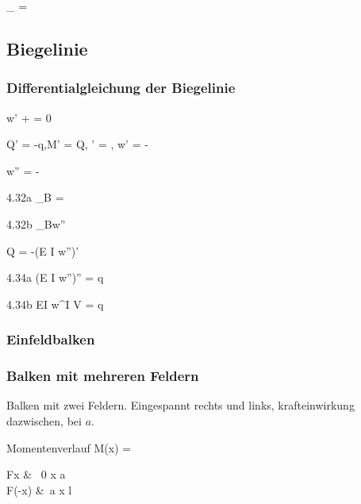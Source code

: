 \documentclass[11pt]{article}
\newcommand{\1}{ {\mathds{1}} }
\newcommand{\abs}[1]{\lvert#1\rvert}
\begin{document}
\begin{multicols}{3}
		\begin{formel}{4.28}
			\sigma_{}
			=
			\frac{\abs{M}}{W}
		\end{formel}

		\subsection{Biegelinie}
		\subsubsection{Differentialgleichung der Biegelinie}

		\begin{formel}{4.29}
			w' + \psi = 0
		\end{formel}
		\begin{formel}{4.30}
			Q' = -q,\quad M' = Q, \quad \psi' = , \quad w' = -\psi
		\end{formel}
		\begin{formel}{4.31}
			w'' = -
		\end{formel}
		\begin{formel}{4.32a}
			\varkappa_B = 
		\end{formel}
		\nopagebreak
		\begin{formel}{4.32b}
			\varkappa_B\approx w''
		\end{formel}
		\begin{formel}{4.33}
			Q = -(E I w'')'
		\end{formel}
		\begin{formel}{4.34a}
			(E I w'')'' = q
		\end{formel}
		\nopagebreak
		\begin{formel}{4.34b}
			EI w^{I V} = q
		\end{formel}

		\subsubsection{Einfeldbalken}
		\subsubsection{Balken mit mehreren Feldern}

		Balken mit zwei Feldern. Eingespannt rechts und links, krafteinwirkung dazwischen, bei $a$. \\
		\nopagebreak
		\begin{formel}{Momentenverlauf}
			M(x) = 
			\begin{cases}
				Fx & \, 0 \leq x \leq a\\
				F\left(\ell -x\right) &\, a \leq x \leq l
			\end{cases}
		\end{formel}


\end{multicols}
\end{document}
